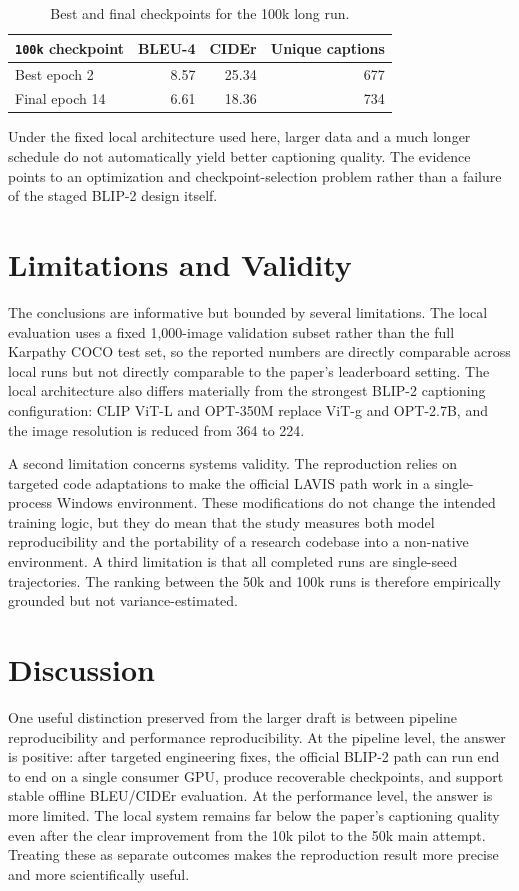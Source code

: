 \documentclass[11pt]{article}
\begin{document}
\begin{table}[H]
\centering
\scriptsize
\begin{tabular}{lrrr}
\toprule
\texttt{100k} checkpoint & BLEU-4 & CIDEr & Unique captions \\
\midrule
Best epoch 2 & 8.57 & 25.34 & 677 \\
Final epoch 14 & 6.61 & 18.36 & 734 \\
\bottomrule
\end{tabular}
\caption{Best and final checkpoints for the 100k long run.}
\label{tab:best-final-v2}
\end{table}

Under the fixed local architecture used here, larger data and a much longer
schedule do not automatically yield better captioning quality. The evidence points to
an optimization and checkpoint-selection problem rather than a failure of the staged
BLIP-2 design itself.

\FloatBarrier

\section{Limitations and Validity}
The conclusions are informative but bounded by several limitations. The local evaluation
uses a fixed 1,000-image validation subset rather than the full Karpathy COCO test set,
so the reported numbers are directly comparable across local runs but not directly
comparable to the paper's leaderboard setting. The local architecture also differs
materially from the strongest BLIP-2 captioning configuration: CLIP ViT-L and OPT-350M
replace ViT-g and OPT-2.7B, and the image resolution is reduced from 364 to 224.

A second limitation concerns systems validity. The reproduction relies on targeted code
adaptations to make the official LAVIS path work in a single-process Windows
environment. These modifications do not change the intended training logic, but they do
mean that the study measures both model reproducibility and the portability of a
research codebase into a non-native environment. A third limitation is that all
completed runs are single-seed trajectories. The ranking between the 50k and 100k runs
is therefore empirically grounded but not variance-estimated.

\section{Discussion}
One useful distinction preserved from the larger draft is between pipeline
reproducibility and performance reproducibility. At the pipeline level, the answer is
positive: after targeted engineering fixes, the official BLIP-2 path can run end to
end on a single consumer GPU, produce recoverable checkpoints, and support stable
offline BLEU/CIDEr evaluation. At the performance level, the answer is more limited.
The local system remains far below the paper's captioning quality even after the clear
improvement from the 10k pilot to the 50k main attempt. Treating these as separate
outcomes makes the reproduction result more precise and more scientifically useful.
\end{document}
